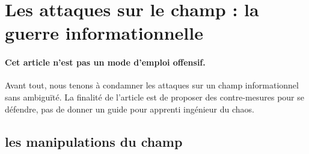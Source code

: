 \documentclass[11pt]{article}
\begin{document}
	\section{Les attaques sur le champ : la guerre informationnelle}
	
		\paragraph{Cet article n'est pas un mode d'emploi offensif.} Avant tout, nous tenons à condamner les attaques sur un champ informationnel sans ambiguïté. La finalité de l'article est de proposer des contre-mesures pour se défendre, pas de donner un guide pour apprenti ingénieur du chaos. 
	
		\subsection{les manipulations du champ}
		
\end{document}
